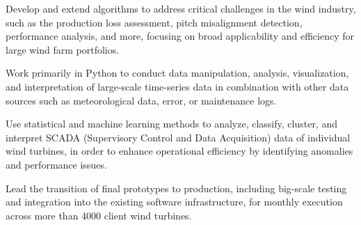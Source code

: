 \begin{tightemize}
    \item Develop and extend algorithms to address critical challenges in the wind industry, such as the production loss assessment, pitch misalignment detection, performance analysis, and more, focusing on broad applicability and efficiency for large wind farm portfolios.
    \item Work primarily in Python to conduct data manipulation, analysis, visualization, and interpretation of large-scale time-series data in combination with other data sources such as meteorological data, error, or maintenance logs.
    \item Use statistical and machine learning methods to analyze, classify, cluster, and interpret SCADA (Supervisory Control and Data Acquisition) data of individual wind turbines, in order to enhance operational efficiency by identifying anomalies and performance issues.
    \item Lead the transition of final prototypes to production, including big-scale testing and integration into the existing software infrastructure, for monthly execution across more than 4000 client wind turbines.
\end{tightemize}